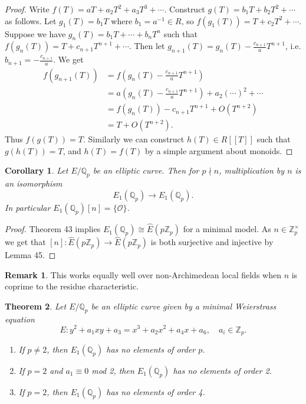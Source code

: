 \documentclass[a4paper]{article}
\newtheorem{theorem}{Theorem}
\newtheorem{corollary}[theorem]{Corollary}
\theoremstyle{definition}
\newtheorem*{remark}{Remark}
\newcommand{\series}[2]{#1[\![#2]\!]}
\renewcommand{\O}{\mathcal{O}}
\newcommand{\Z}{\mathbb{Z}}
\newcommand{\Q}{\mathbb{Q}}
\begin{document}
\begin{proof}
    Write $f(T)=aT+a_2T^2+a_3T^3+\cdots$. Construct $g(T)=b_1T+b_2T^2+\cdots$ as
    follows. Let $g_1(T)=b_1T$ where $b_1=a^{-1}\in R$, so
    $f(g_1(T))=T+c_2T^2+\cdots$. Suppose we have $g_n(T)=b_1T+\cdots+b_nT^n$
    such that $f(g_n(T))=T+c_{n+1}T^{n+1}+\cdots$. Then let
    $g_{n+1}(T)=g_n(T)-\frac{c_{n+1}}{a}T^{n+1}$, i.e.
    $b_{n+1}=-\frac{c_{n+1}}{a}$. We get
    \begin{align*}
        f(g_{n+1}(T))
            &= f(g_n(T)-\frac{c_{n+1}}{a}T^{n+1}) \\
            &= a(g_n(T) - \frac{c_{n+1}}{a}T^{n+1}) + a_2(\cdots)^2 + \cdots \\
            &= f(g_n(T)) - c_{n+1}T^{n+1} + O(T^{n+2}) \\
            &= T + O(T^{n+2}).
    \end{align*}
    Thus $f(g(T))=T$. Similarly we can construct $h(T)\in\series{R}{T}$ such
    that $g(h(T))=T$, and $h(T)=f(T)$ by a simple argument about monoids.
\end{proof}

\begin{corollary}
    Let $E/\Q_p$ be an elliptic curve. Then for $p\nmid n$, multiplication by
    $n$ is an isomorphism
    \begin{equation*}
        E_1(\Q_p)\to E_1(\Q_p).
    \end{equation*}
    In particular $E_1(\Q_p)[n]=\{\O\}$.
\end{corollary}

\begin{proof}
    Theorem 43 implies $E_1(\Q_p)\cong\hat E(p\Z_p)$ for a minimal model. As
    $n\in\Z_p^\times$ we get that $[n]:\hat E(p\Z_p)\to\hat E(p\Z_p)$ is both
    surjective and injective by Lemma 45.
\end{proof}

\begin{remark}
    This works equally well over non-Archimedean local fields when $n$ is
    coprime to the residue characteristic.
\end{remark}

\begin{theorem}
    Let $E/\Q_p$ be an elliptic curve given by a minimal Weierstrass equation
    \begin{equation*}
        E:y^2+a_1xy+a_3=x^3+a_2x^2+a_4x+a_6,\quad a_i\in\Z_p.
    \end{equation*}
    \begin{enumerate}[label=(\roman*)]
        \item If $p\ne2$, then $E_1(\Q_p)$ has no elements of order $p$.
        \item If $p=2$ and $a_1\equiv0$ mod 2, then $E_1(\Q_p)$ has no elements
            of order 2.
        \item If $p=2$, then $E_1(\Q_p)$ has no elements of order 4.
    \end{enumerate}
\end{theorem}
\end{document}
